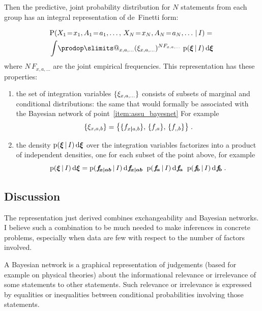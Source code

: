 \documentclass[\ifafour a4paper,12pt,\else a5paper,10pt,\fi%
onecolumn,oneside,article,%
british%
]{memoir}
\makeatletter
\theoremstyle{remark}
\theoremstyle{innote}
\def\prod{\DOTSI\prodop\slimits@}
\newcommand*{\di}{\mathrm{d}}%
\DeclarePairedDelimiter\set{\{}{\}}
\newcommand*{\pf}{\mathrm{p}}%
\newcommand*{\p}{\mathrm{P}}%
\renewcommand*{\|}[1][]{\nonscript\,#1\vert\nonscript\,\mathopen{}}
\newcommand*{\eq}{\mathrel{\!=\!}}
\renewcommand*{\=}{\TextOrMath\texteq\eq}
\newcommand*{\X}[1]{X_{#1}}
\newcommand*{\x}[1]{x_{#1}}
\newcommand*{\A}[1]{A_{#1}}
\newcommand*{\va}[1]{a_{#1}}
\newcommand*{\ff}[1]{f_{#1}}
\newcommand*{\ffb}[1]{\bm{f_{\!#1}}}
\newcommand*{\FF}[1]{F_{#1}}
\newcommand*{\bcond}[1][]{\nonscript\,#1\bm{\vert}\nonscript\;\mathopen{}}
\makeatother
\begin{document}
Then the predictive, joint probability distribution for $N$ statements from each
group has an integral representation of de~Finetti form:
\begin{framed}
  \begin{multline}
    \label{eq:general_form}
    \p( \X{1}\eq \x{1}, \A{1}\eq \va{1}, \dotsc,\,
    \X{N}\eq \x{N}, \A{N}\eq \va{N}, \dotsc \| I) ={}\\
    \int\!\prod_{x,a,\dotsc}
    (\xi_{x,a,\dotsc})^{N \FF{x,a,\dotsc}}\;%
    \pf(\bm{\xi}\|I)\,\di\bm{\xi} 
  \end{multline}
where $N\,\FF{x,a,\dotsc}$ are the joint empirical frequencies. This
representation has these properties:
  \begin{enumerate}[label=\Roman*.]
  \item the set of integration variables $\set{\xi_{x,a,\dotsc}}$ consists
    of subsets of marginal and conditional distributions: the same that
    would formally be associated with the Bayesian network of
    point~\ref{item:assu_bayesnet} For example
    \[\set{\xi_{x,a,b}} = \set[\big]{\set{\ff{x \bcond a,b}},\,
        \set{\ff{,a}},\, \set{\ff{,,b}}}\;.\]
  \item the density $\pf(\bm{\xi}\|I)\,\di\bm{\xi}$ over the integration
    variables factorizes into a product of independent densities, one for
    each subset of the point above, for example
    \[\pf(\bm{\xi}\|I)\,\di\bm{\xi} =
      \pf(\ffb{x \bcond ab}\|I)\,\di\ffb{x \bcond ab}\;\;
      \pf(\ffb{a}\|I)\,\di\ffb{a}\;\; \pf(\ffb{b}\|I)\,\di\ffb{b} \;.
    \]
  \end{enumerate}
\end{framed}

\subsection{Discussion}
\label{sec:disc_exchbayesnet}

The representation just derived combines exchangeability and Bayesian
networks. I believe such a combination to be much needed to make inferences
in concrete problems, especially when data are few with respect to the
number of factors involved.

A Bayesian network is a graphical representation of judgements (based for
example on physical theories) about the informational relevance or
irrelevance of some statements to other statements. Such relevance or
irrelevance is expressed by equalities or inequalities between conditional
probabilities involving those statements.
\end{document}
